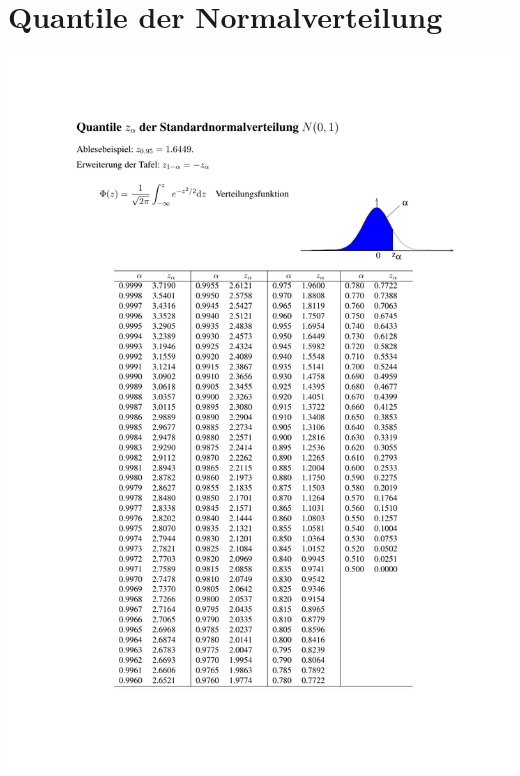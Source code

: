 \documentclass[a4paper,11pt]{book}
\begin{document}
\section{Quantile der Normalverteilung}
\begin{center}
 \includegraphics[width=190mm]{05_vorlesung/media/NV_Quantile.pdf}
\end{center}

\end{document}
